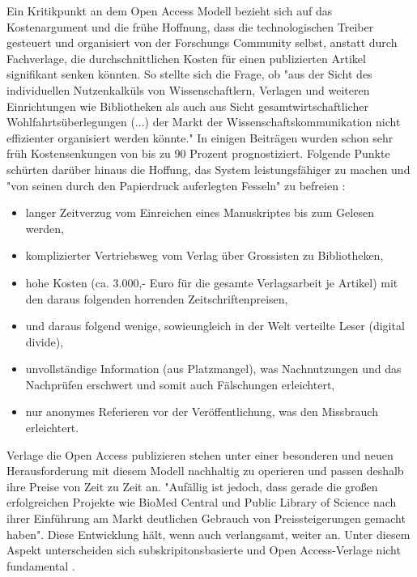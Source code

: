 Ein Kritikpunkt an dem Open Access Modell bezieht sich auf das Kostenargument und die frühe Hoffnung, dass die technologischen Treiber gesteuert und organisiert von der Forschungs Community selbst, anstatt durch Fachverlage, die durchschnittlichen Kosten für einen publizierten Artikel signifikant senken könnten. So stellte sich die Frage, ob
"aus der Sicht des individuellen Nutzenkalküls von Wissenschaftlern, Verlagen und weiteren Einrichtungen wie Bibliotheken als auch aus Sicht gesamtwirtschaftlicher Wohlfahrtsüberlegungen (...) der Markt der Wissenschaftskommunikation nicht effizienter organisiert werden könnte."\cite{Hess_2006} In einigen Beiträgen wurden schon sehr früh Kostensenkungen von bis zu 90 Prozent \cite{hilf_2004} \cite{suchen} prognostiziert. Folgende Punkte schürten darüber hinaus die Hoffung, das System leistungsfähiger zu machen und "von seinen durch den Papierdruck auferlegten Fesseln" zu befreien \cite{hilf_2004}:
\begin{itemize}
\item langer Zeitverzug vom Einreichen eines Manuskriptes bis zum Gelesen werden,
\item komplizierter Vertriebsweg vom Verlag über Grossisten zu Bibliotheken,
\item hohe Kosten (ca. 3.000,- Euro für die gesamte Verlagsarbeit je Artikel) mit den daraus folgenden horrenden Zeitschriftenpreisen,
\item und daraus folgend wenige, sowieungleich in der Welt verteilte Leser (digital divide),
\item unvollständige Information (aus Platzmangel), was Nachnutzungen und das Nachprüfen erschwert und somit auch Fälschungen erleichtert,
\item nur anonymes Referieren vor der Veröffentlichung, was den Missbrauch erleichtert.
\end{itemize}

Verlage die Open Access publizieren stehen unter einer besonderen und neuen Herausforderung mit diesem Modell nachhaltig zu operieren und passen deshalb ihre Preise von Zeit zu Zeit an. "Aufällig ist jedoch, dass gerade die großen erfolgreichen Projekte wie BioMed Central und Public Library of Science nach ihrer Einführung am Markt deutlichen Gebrauch von Preissteigerungen gemacht haben"\cite{schmidt_2007_goldenen}. Diese Entwicklung hält, wenn auch verlangsamt, weiter an\cite{suchen}. Unter diesem Aspekt unterscheiden sich subskripitonsbasierte und Open Access-Verlage nicht fundamental \cite{schmidt_2007_goldenen}.

